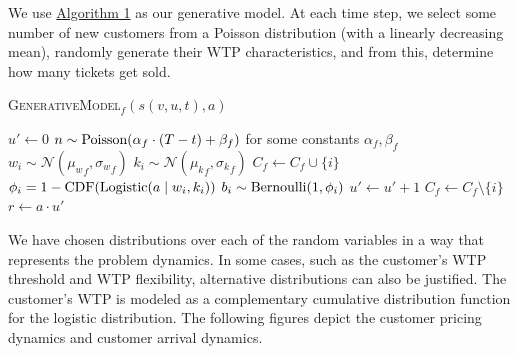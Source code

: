 \documentclass[10pt,letterpaper]{article}
\begin{document}
\begin{multicols*}{2}
We use \hyperref[alg:generative-model]{Algorithm 1} as our generative model. At each time step, we select some number of new customers from a Poisson distribution (with a linearly decreasing mean), randomly generate their WTP characteristics, and from this, determine how many tickets get sold.

\begin{algorithm}[H]
\label{alg:generative-model}
	\caption{\textsc{GenerativeModel$_f (s (v, u, t), a)$}}
	\small\begin{algorithmic}[1]
	    \State $u' \leftarrow 0$
	    \State $n \sim \textnormal{Poisson}(\alpha_f \cdot (T-t) + \beta_f)$ for some constants $\alpha_f, \beta_f$ %
            \State $w_{i} \sim \mathcal{N}({\mu_w}_f, {\sigma_w}_f)$
            \State $k_{i} \sim \mathcal{N}({\mu_k}_f, {\sigma_k}_f)$
            \State $C_f \leftarrow C_f \cup \{i\}$
        \EndFor
            \State $\phi_{i} = 1 - \textnormal{CDF(Logistic}(a \mid w_i, k_i))$
            \State $b_i \sim \textnormal{Bernoulli}(1,\phi_i)$
                \State $u' \leftarrow u' + 1$
                \State $C_f \leftarrow C_f \setminus \{i\}$
            \EndIf
        \EndFor
	    \State ${r} \leftarrow a \cdot u'$       
		\State{}
	\end{algorithmic}
\end{algorithm}

We have chosen distributions over each of the random variables in a way that represents the problem dynamics. In some cases, such as the customer's WTP threshold and WTP flexibility, alternative distributions can also be justified. The customer's WTP is modeled as a complementary cumulative distribution function for the logistic distribution. The following figures depict the customer pricing dynamics and customer arrival dynamics.


\end{multicols*}
\end{document}
